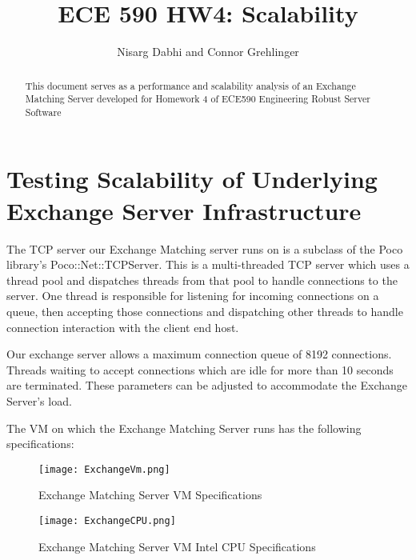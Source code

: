 \documentclass[letterpaper, 10 pt, conference]{ieeeconf}
\title{\LARGE \bf
ECE 590 HW4: Scalability
}
\author{Nisarg Dabhi and Connor Grehlinger}
\begin{document}
\maketitle
\thispagestyle{empty}
\pagestyle{empty}


\begin{abstract}

This document serves as a performance and scalability analysis of an Exchange Matching Server developed for Homework 4 of ECE590 Engineering Robust Server Software

\end{abstract}

\section{Testing Scalability of Underlying Exchange Server Infrastructure}

The TCP server our Exchange Matching server runs on is a subclass of the Poco library’s Poco::Net::TCPServer. This is a multi-threaded TCP server which uses a thread pool and dispatches threads from that pool to handle connections to the server. One thread is responsible for listening for incoming connections on a queue, then accepting those connections and dispatching other threads to handle connection interaction with the client end host.
 
 
 
Our exchange server allows a maximum connection queue of 8192 connections. Threads waiting to accept connections which are idle for more than 10 seconds are terminated. These parameters can be adjusted to accommodate the Exchange Server’s load.



The VM on which the Exchange Matching Server runs has the following specifications: 


\begin{figure}[!htb]
    \centering
    \texttt{[image: ExchangeVm.png]}
    \caption{Exchange Matching Server VM 
    Specifications}
    \label{fig:Exchange}
\end{figure}


\begin{figure}[!htb]
    \centering
    \texttt{[image: ExchangeCPU.png]}
    \caption{Exchange Matching Server
    VM Intel CPU Specifications}
    \label{fig:Intel}
\end{figure}
\end{document}
